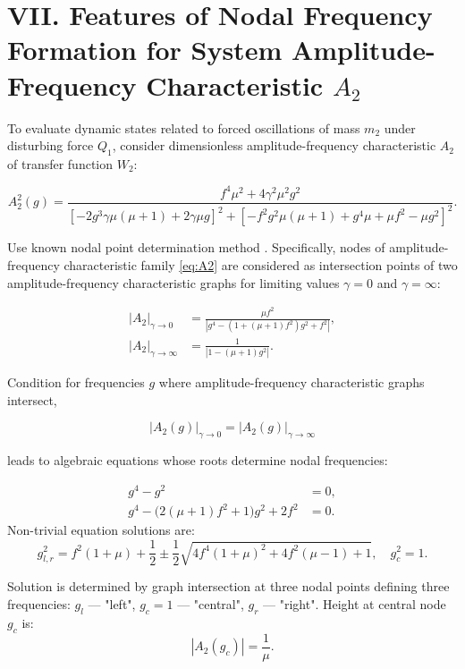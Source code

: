 \documentclass[12pt, a4paper]{article}
\begin{document}
	\section*{VII. Features of Nodal Frequency Formation for System Amplitude-Frequency Characteristic $A_2$}	
	
	To evaluate dynamic states related to forced oscillations of mass $m_2$ under disturbing force $Q_1$, consider dimensionless amplitude-frequency characteristic $A_2$ of transfer function $W_2$:
	
	\begin{equation}
		A_2^2(g) = \frac{f^4\mu^2 + 4\gamma^2\mu^2 g^2}{
			[-2g^3\gamma\mu(\mu+1)+2\gamma\mu g]^2 + 
			[-f^2g^2\mu(\mu+1)+g^4\mu+\mu f^2-\mu g^2]^2
		}.
		\label{eq:A2}
	\end{equation}
	
	Use known nodal point determination method \cite{DenHartog1956}. Specifically, nodes of amplitude-frequency characteristic family \eqref{eq:A2} are considered as intersection points of two amplitude-frequency characteristic graphs for limiting values $\gamma=0$ and $\gamma=\infty$:	
	
	\begin{align}
		|A_2|_{\gamma \to 0} &= \frac{\mu f^2}{|g^4 - (1+(\mu+1)f^2)g^2 + f^2|},
		\label{eq:A2_gamma0} \\
		|A_2|_{\gamma \to \infty} &= \frac{1}{|1 - (\mu+1)g^2|}.
		\label{eq:A2_gammainf}
	\end{align}
	
	Condition for frequencies $g$ where amplitude-frequency characteristic graphs intersect, 
	
	\begin{equation}
		|A_2(g)|_{\gamma \to 0} = |A_2(g)|_{\gamma \to \infty} 
	\end{equation}	
	
	leads to algebraic equations whose roots determine nodal frequencies:
	
	\begin{align}
		g^4 - g^2 &= 0,\\
		g^4 - \bigl(2(\mu+1)f^2 + 1\bigr) g^2 + 2f^2 &= 0.
	\end{align}
	Non-trivial equation solutions are:
	\begin{equation}
		g_{l,r}^2 = f^2(1+\mu) + \frac{1}{2} \pm \frac{1}{2}\sqrt{4f^4(1+\mu)^2 + 4f^2(\mu-1) + 1},\quad
		g_c^2 = 1.
		\label{eq:tritochki}
	\end{equation}
	
	Solution is determined by graph intersection at three nodal points defining three frequencies: $g_l$ --- "left", $g_c = 1$ --- "central", $g_r$ --- "right". Height at central node $g_c$ is:
	\begin{equation}
		|A_2(g_c)| = \frac{1}{\mu}.
		\label{eq:Hc}
	\end{equation}
	
\end{document}
